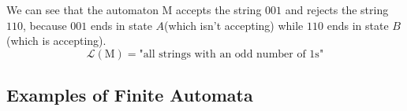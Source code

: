 \documentclass{article}
\begin{document}
\begin{itemize}
\begin{itemize}
\begin{table}[H]
\begin{center}
    \end{center}
    \end{table}
    \end{itemize}
    We can see that the automaton M accepts the string $001$ and rejects the string $110$, because $001$ ends in state $A$(which isn't accepting) while $110$ ends in state $B$(which is accepting).
    $$\mathcal{L}\left(\text{M}\right)=\text{"all strings with an odd number of 1s"}$$
\end{itemize}



\subsection*{Examples of Finite Automata}
\end{document}
